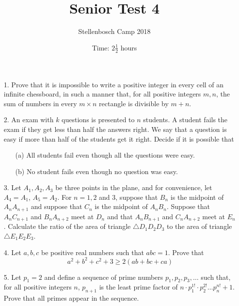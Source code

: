 \documentclass[a4paper, 12pt]{article}
\title{Senior Test 4}
\author{Stellenbosch Camp 2018}
\date{Time: $2 \frac{1}{2}$ hours}
\begin{document}
 \maketitle

\begin{enumerate}

\item[1.]  Prove that it is impossible to write a positive integer in every cell of an infinite chessboard, in such a manner that, for all positive integers $m, n$, the sum of numbers in every $m\times n$ rectangle is divisible by $m + n$.


\vspace{7pt}

\item[2.] An exam with $k$ questions is presented to $n$ students. A student fails the exam if they get less than half the answers right. We say that a question is easy if more than half of the students get it right. Decide if it is possible that

\begin{enumerate}
    \item[(a)]  All students fail even though all the questions were easy.
    \item[(b)] No student fails even though no question was easy.
\end{enumerate}



\vspace{5pt}

\item[3.]   %
Let $A_1, A_2, A_3$ be three points in the plane, and for convenience, let $A_4 = A_1$, $A_5 = A_2$. For $n = 1, 2$ and $3$, suppose that $B_n$ is the midpoint of $A_n A_{n+1}$ and suppose that $C_n$ is the midpoint of $A_n B_n$. Suppose that $A_n C_{n+1}$ and $B_n A_{n+2}$ meet at $D_n$ and that $A_n B_{n+1}$ and $C_n A_{n+2}$ meet at $E_n$. Calculate the ratio of the area of triangle $\triangle D_1 D_2 D_3$ to the area of triangle $\triangle E_1 E_2 E_3$.

\vspace{7pt}

\item[4.]  Let $a, b, c$ be positive real numbers such that $abc = 1$. Prove that
\begin{equation*}
    a^2 + b^2 + c^2 + 3 \geq 2(ab + bc + ca)
\end{equation*}


\vspace{5pt}

\item[5.]   Let $p_1 = 2$ and define a sequence of prime numbers $p_1, p_2, p_3, \dots$ such that, for all positive integers $n$, $p_{n+1}$ is the least prime factor of $n \cdot p_1^{1!} \cdot p_2^{2!} \dots p_n^{n!} + 1$. Prove that all primes appear in the sequence.

\end{enumerate}
\end{document}
